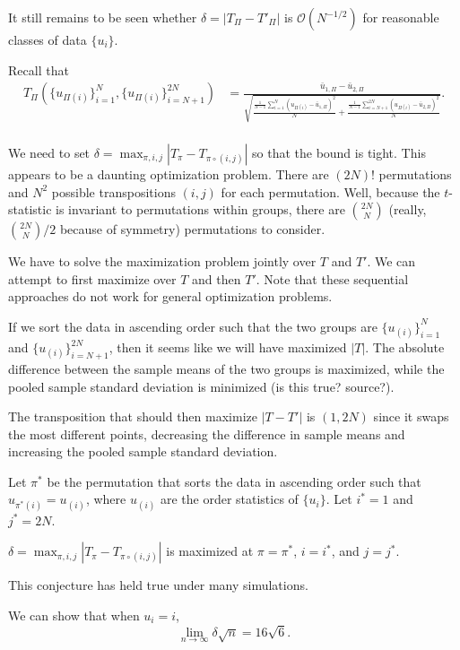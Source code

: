 It still remains to be seen whether $\delta = |T_{\Pi}-T'_{\Pi}|$ is
$\mathcal{O}(N^{-1/2})$ for reasonable classes of data $\{u_i\}$.

Recall that
\begin{align*}
T_{\Pi}(\{u_{\Pi(i)}\}_{i=1}^N, \{u_{\Pi(i)}\}_{i=N+1}^{2N})
&= \frac{\bar{u}_{1,\Pi} - \bar{u}_{2,\Pi}}{\sqrt{\frac{\frac{1}{N-1}
      \sum_{i=1}^N(u_{\Pi(i)} - \bar{u}_{1,\Pi})^2}{N} + \frac{\frac{1}{N-1}
      \sum_{i=N+1}^{2N}(u_{\Pi(i)} - \bar{u}_{2,\Pi})^2}{N}}}. \\
\end{align*}

We need to set $\delta = \max_{\pi, i, j} |T_{\pi} - T_{\pi \circ (i, j)}|$
so that the bound is tight.  This appears to be a daunting
optimization problem.  There are $(2N)!$ permutations and $N^2$
possible transpositions $(i, j)$ for each permutation.  Well, because the
$t$-statistic is invariant to permutations within groups, there are
$\binom{2N}{N}$ (really, $\binom{2N}{N} / 2$ because of symmetry)
permutations to consider.

We have to solve the maximization problem jointly over $T$ and $T'$.  We can
attempt to first maximize over $T$ and then $T'$.  Note that these sequential
approaches do not work for general optimization problems.

If we sort the data in ascending order such that the two groups are
$\{u_{(i)}\}_{i=1}^{N}$ and $\{u_{(i)}\}_{i=N+1}^{2N}$, then it seems like
we will have maximized $|T|$.  The absolute difference between the sample
means of the two groups is maximized, while the pooled sample standard
deviation is minimized (is this true? source?).

The transposition that should then maximize $|T - T'|$ is $(1, 2N)$ since it
swaps the most different points, decreasing the difference in sample means and
increasing the pooled sample standard deviation.

Let $\pi^*$ be the permutation that sorts the data in ascending order
such that $u_{\pi^*(i)} = u_{(i)}$, where $u_{(i)}$ are the order statistics
of $\{u_i\}$.  Let $i^* = 1$ and $j^* = 2N$.

\begin{conjecture}
  $\delta = \max_{\pi, i, j} |T_{\pi} - T_{\pi \circ (i, j)}|$ is maximized at
  $\pi = \pi^*$, $i = i^*$, and $j = j^*$.
\end{conjecture}

This conjecture has held true under many simulations.

We can show that when $u_i = i$,
\begin{equation*}
  \lim_{n \to \infty} \delta \sqrt{n} = 16 \sqrt{6}.
\end{equation*}